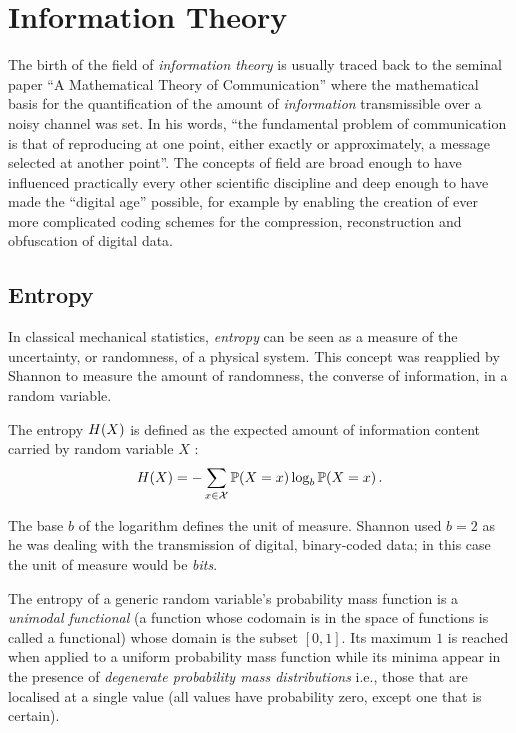 \section{Information Theory} \label{sec:information-theory}
The birth of the field of \textit{information theory} is usually traced back to the seminal paper \enquote{A Mathematical Theory of Communication} \citep{Shannon1949} where the mathematical basis for the quantification of the amount of \textit{information} transmissible over a noisy channel was set. 
In his words, \enquote{the fundamental problem of communication is that of reproducing at one point, either exactly or approximately, a message selected at another point}.
The concepts of field are broad enough to have influenced practically every other scientific discipline and deep enough to have made the \enquote{digital age} possible, for example by enabling the creation of ever more complicated coding schemes for the compression, reconstruction and obfuscation of digital data.

\subsection{Entropy} \label{subsec:entropy}
In classical mechanical statistics, \textit{entropy} can be seen as a measure of the uncertainty, or randomness, of a physical system.  
This concept was reapplied by Shannon to measure the amount of randomness, the converse of information, in a random variable.
\begin{definition}[Entropy] \label{def:entropy}
	The entropy $H(X)$ is defined as the expected amount of information content carried by random variable $X$ \citep{Schneider2005}:
\begin{equation*}
	H(X) = -\sum\limits_{x \in \mathcal{X}} \mathbb{P}(X=x) \log_{b} \mathbb{P}(X=x) \,.
\end{equation*}
\end{definition}
The base $b$ of the logarithm defines the unit of measure.  
Shannon used $b=2$ as he was dealing with the transmission of digital, binary-coded data; in this case the unit of measure would be \textit{bits}.

The entropy of a generic random variable's probability mass function is a \textit{unimodal functional} (a function whose codomain is in the space of functions is called a functional) whose domain is the subset $[0,1]$.
Its maximum $1$ is reached when applied to a uniform probability mass function while its minima appear in the presence of \textit{degenerate probability mass distributions} i.e., those that are localised at a single value (all values have probability zero, except one that is certain).

